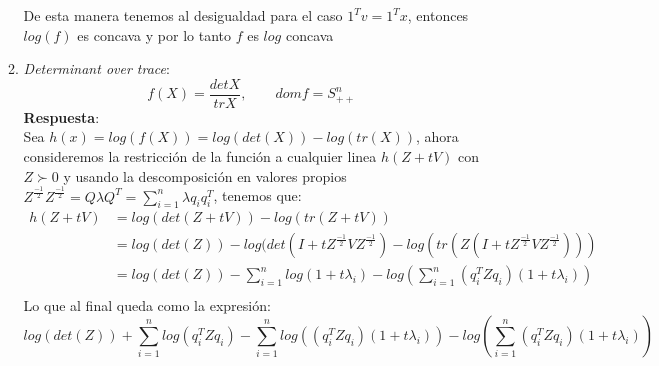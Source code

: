 \documentclass[12pt, oneside]{article}%
\begin{document}
\begin{enumerate}
\begin{enumerate}
     De esta manera tenemos al desigualdad para el caso  $1^Tv = 1^Tx$, entonces $log(f)$ es concava y por lo tanto $f$ es $log$ concava
    
    \item \textit{Determinant over trace}:
    $$f(X) = \frac{det X}{tr X}, \qquad dom f = S_{++}^n$$
    \textbf{Respuesta}: \\
    Sea $h(x) = log(f(X)) = log(det(X)) - log(tr(X))$, ahora consideremos la restricción de la función a cualquier linea $h(Z + tV)$ con $Z \succ  0$ y usando la descomposición en valores propios $Z^{\frac{-1}{2}}Z^{\frac{-1}{2}} = Q\lambda Q^T = \sum_{i=1}^n \lambda q_iq_i^T$, tenemos que: 
    \begin{align}
        h(Z+tV) &= log(det(Z+tV)) - log(tr(Z+tV))\\ 
                &= log(det(Z)) - log(det(I + tZ^{\frac{-1}{2}}VZ^{\frac{-1}{2}}) - log(tr(Z(I +tZ^{\frac{-1}{2}}VZ^{\frac{-1}{2}})))\\
                &= log(det(Z)) - \sum_{i=1}^n log(1+t \lambda_i) - log \left(\sum_{i=1}^n (q_i^TZq_i)(1+t\lambda_i)\right)\\
    \end{align}
    Lo que al final queda como la expresión: 
    $$log(det(Z)) + \sum_{i=1}^n log(q_i^T Z q_i) - \sum_{i=1}^n log((q_i^TZq_i)(1+t\lambda_i)) - log \left(\sum_{i=1}^n (q_i^TZq_i)(1+t\lambda_i)\right)$$
    

\end{enumerate}
\end{enumerate}
\end{document}
